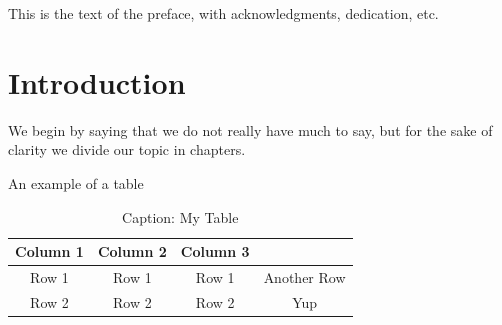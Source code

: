 \documentclass[hidelinks,pdftex,phd]{pittetd}
\begin{document}
\maketitle
\makecommittee
\copyrightpage                     
\begin{abstract}
The abstract of the document.
This document is a sample file for the creation of ETD's at Pitt through \LaTeX.
\end{abstract}

\tableofcontents
\listoftables                      
\listoffigures                
\preface
This is the text of the preface, with acknowledgments, dedication, etc. 
%
%




\chapter{Introduction}%
We begin by saying that we do not really have much to say, but for the sake of clarity we divide our topic in chapters.

An example of a table
\begin{table}[h]
\centering
\caption{Caption: My Table}
\label{Reference: Title of my Table}
\begin{tabular}{|c|c|c|c|}
\hline
Column 1 & Column 2 & Column 3 &\\ \hline
Row 1 & Row 1 & Row 1 & Another Row\\ \hline
Row 2 & Row 2 & Row 2 & Yup\\ \hline
\end{tabular}
\end{table}
\end{document}
